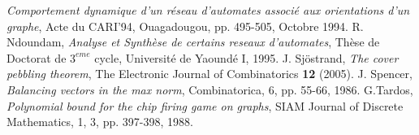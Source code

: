 \documentclass{article}
\begin{document}
\begin{thebibliography}{AND 89}
 {\it Comportement dynamique d'un r\'eseau d'automates associ\'e aux
 orientations d'un graphe},
Acte du CARI'94, Ouagadougou, pp. 495-505,
 Octobre 1994.
 R. Ndoundam,
 {\it Analyse et Synth\`ese de certains reseaux d'automates},
Th\`ese de Doctorat de $3^{eme}$ cycle, Universit\'e de Yaound\'e I,
 1995.
 J. Sj\"{o}strand, {\it The cover pebbling theorem},
 The Electronic Journal of Combinatorics {\bf 12} (2005). 
 J. Spencer,
 {\it Balancing vectors in the max norm},
Combinatorica, 6, pp. 55-66,
 1986.
 G.Tardos,
 {\it Polynomial bound for the chip firing game on graphs},
SIAM Journal of Discrete Mathematics, 1, 3, pp. 397-398,
 1988.
\end{thebibliography}
\end{document}
